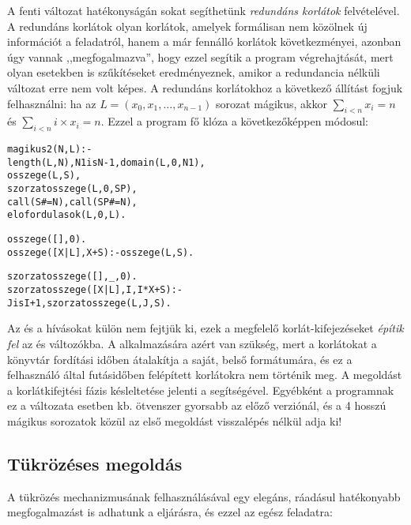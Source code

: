 A fenti változat hatékonyságán sokat segíthetünk \emph{redundáns korlátok}
felvételével. A redundáns korlátok olyan korlátok, amelyek formálisan nem
közölnek új információt a feladatról, hanem a már fennálló korlátok következményei,
azonban úgy vannak ,,megfogalmazva'', hogy ezzel segítik a program végrehajtását,
mert olyan esetekben is szűkítéseket eredményeznek, amikor a redundancia nélküli
változat erre nem volt képes. A redundáns korlátokhoz a következő állítást
fogjuk felhasználni:
\br
\tetel ha az $L = (x_{0}, x_{1}, \ldots, x_{n-1})$ sorozat mágikus,
akkor $\sum_{i<n} x_{i} = n$ és $\sum_{i<n} i \times x_{i} = n$.
\br
Ezzel a program fő klóza a következőképpen módosul:
\begin{alltt}
% Az L lista egy N hosszú mágikus sorozat
magikus2(N, L) :-
    length(L, N), N1 is N-1, domain(L, 0, N1),
    osszege(L, S),               % \(\sum_{i\in [1..\cd{N}]} L_{i} = \cd{S}\)
    szorzatosszege(L, 0, SP),    % \(\sum_{i\in [1..\cd{N}]} i*L_{i} = \cd{SP}\)
    call(S #= N), call(SP #= N), % lásd a megjegyzést
    elofordulasok(L, 0, L).      % lásd az előző lapon

% osszege(L, Ossz): Ossz = \(\sum_i \cd{L}_i\)
osszege([], 0).
osszege([X|L], X+S) :- osszege(L, S).

% szorzatosszege(L, I, Ossz): Ossz = \(\cd{I}*\cd{L}_1+\cd{(I+1)}*\cd{L}_2+\ldots\)
szorzatosszege([], _, 0).
szorzatosszege([X|L], I, I*X+S) :- 
    J is I+1, szorzatosszege(L, J, S).
\end{alltt}

Az  és a  hívásokat külön nem fejtjük ki, ezek
a megfelelő korlát-kifejezéseket \emph{építik fel} az  és  változókba.
A  alkalmazására azért van szükség, mert a korlátokat a \clpfd könyvtár
fordítási időben átalakítja a saját, belső formátumára, és ez a felhasználó által
futásidőben felépített korlátokra nem történik meg. A megoldást a korlátkifejtési
fázis késleltetése jelenti a  segítségével. Egyébként a programnak ez a
változata  esetben kb. ötvenszer gyorsabb az előző verziónál, és a 4 hosszú
mágikus sorozatok közül az első megoldást visszalépés nélkül adja ki!

\subsection{Tükrözéses megoldás}

A tükrözés mechanizmusának felhasználásával egy elegáns, ráadásul hatékonyabb
megfogalmazást is adhatunk a  eljárásra, és ezzel az egész
feladatra:

